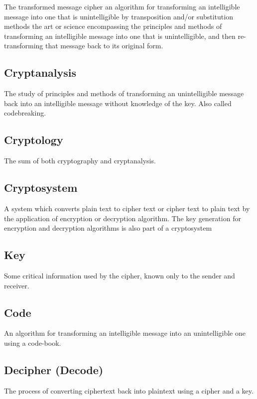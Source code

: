 \documentclass[british]{article}
\begin{document}
The transformed message cipher an algorithm for transforming an intelligible
message into one that is unintelligible by transposition and/or substitution
methods the art or science encompassing the principles and methods
of transforming an intelligible message into one that is unintelligible,
and then re-transforming that message back to its original form.

\subsection{Cryptanalysis}

The study of principles and methods of transforming an unintelligible
message back into an intelligible message without knowledge of the
key. Also called codebreaking.

\subsection{Cryptology}

The sum of both cryptography and cryptanalysis.

\subsection{Cryptosystem}

A system which converts plain text to cipher text or cipher text to
plain text by the application of encryption or decryption algorithm.
The key generation for encryption and decryption algorithms is also
part of a cryptosystem

\subsection{Key}

Some critical information used by the cipher, known only to the sender
and receiver.

\subsection{Code}

An algorithm for transforming an intelligible message into an unintelligible
one using a code-book.

\subsection{Decipher (Decode)}

The process of converting ciphertext back into plaintext using a cipher
and a key.
\end{document}
